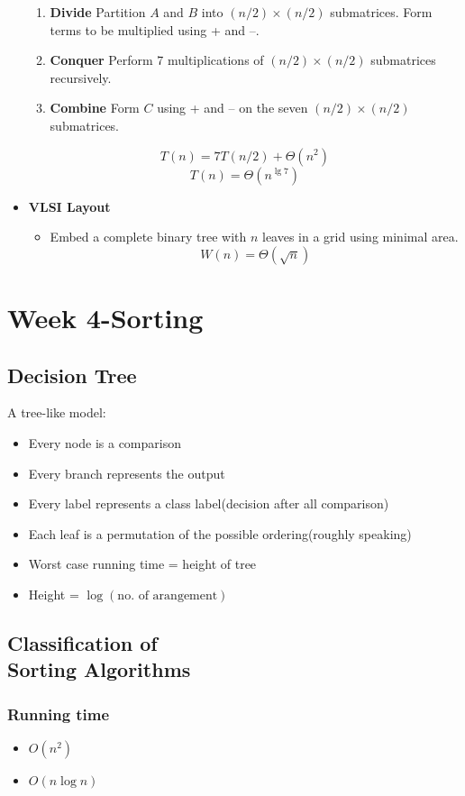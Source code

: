 \documentclass{article}
\begin{document}
\begin{multicols*}{4}
\begin{itemize}
\begin{enumerate}
	\item \textbf{Divide} Partition $A$ and $B$ into $(n/2)\times(n/2)$ submatrices. Form terms to be multiplied using + and –.
	\item \textbf{Conquer} Perform 7 multiplications of $(n/2)\times(n/2)$ submatrices recursively.
	\item \textbf{Combine} Form $C$ using + and – on the seven $(n/2)\times(n/2)$ submatrices.
	\end{enumerate}
	$$T(n)=7T(n/2) +\Theta(n^2)$$
	$$T(n)=\Theta(n^{\lg 7})$$
	
\item \textbf{VLSI Layout}
	\begin{itemize}
	\item Embed a complete binary tree with $n$ leaves in a grid using minimal area.
	$$W(n)=\Theta(\sqrt{n})$$
	\end{itemize}
\end{itemize}

\section{Week 4-Sorting}
\subsection{Decision Tree}
A tree-like model:
\begin{itemize}
\item Every node is a comparison
\item Every branch represents the output
\item Every label represents a class label(decision after all comparison)
\item Each leaf is a permutation of the possible ordering(roughly speaking)
\item Worst case running time = height of tree
\item Height = $\log (\text{no. of arangement})$
\end{itemize}
\subsection{Classification of\\Sorting Algorithms}
\subsubsection{Running time}
\begin{itemize}
\item $O(n^2)$
\item $O(n\log n)$
\end{itemize}

\end{multicols*}
\end{document}
